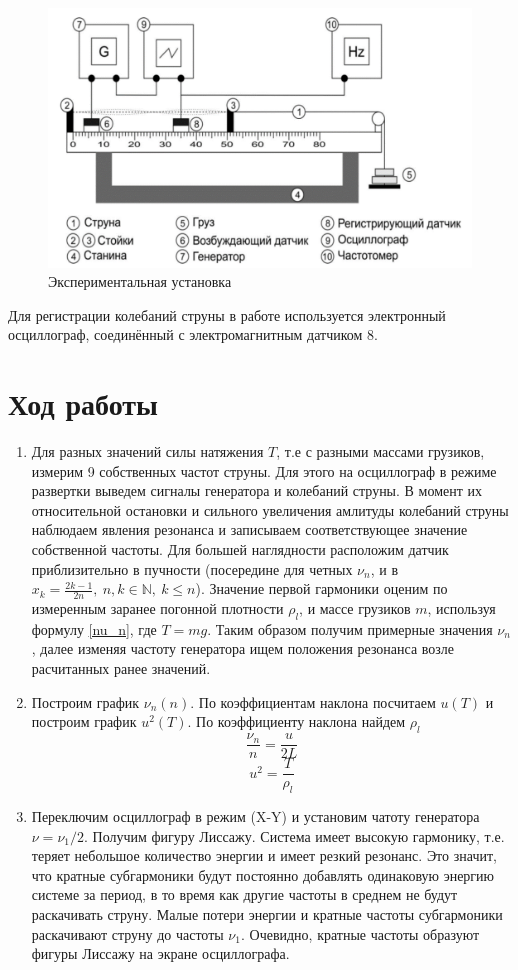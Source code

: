 \documentclass[a4paper, 12pt]{article}
\begin{document}
\begin{figure}[h!]
    \centering
    \includegraphics[scale=0.5]{exp_setup.png}
    \caption{Экспериментальная установка}
    \label{fig:experimental_setup}
\end{figure}

Для регистрации колебаний струны в работе используется электронный осциллограф, соединённый с электромагнитным датчиком 8.
\newpage
\section{Ход работы}
\begin{enumerate}
    \item Для разных значений силы натяжения \(T\), т.е с разными массами грузиков, измерим 9 собственных частот струны. Для этого на осциллограф в режиме развертки выведем сигналы генератора и колебаний струны. В момент их относительной остановки и сильного увеличения амлитуды колебаний струны наблюдаем явления резонанса и записываем соответствующее значение собственной частоты. Для большей наглядности расположим датчик приблизительно в пучности (посередине для четных \(\nu_n\), и в \(x_k = \frac{2k-1}{2n}, \ n,k \in \mathbb{N}, \ k\leq n\)). Значение первой гармоники оценим по измеренным заранее погонной плотности \(\rho_l\), и массе грузиков \(m\), используя формулу \ref{nu_n}, где \(T=mg\). Таким образом получим примерные значения \(\nu_n\), далее изменяя частоту генератора ищем положения резонанса возле расчитанных ранее значений.
    \item Построим график \(\nu_n(n)\). По коэффициентам наклона посчитаем \(u(T)\)  и построим график \(u^2(T)\). По коэффициенту наклона найдем \(\rho_l\)
    \[\frac{\nu_n}{n} = \frac{u}{2L}\]
    \[u^2 = \frac{T}{\rho_l}\]
    \item Переключим осциллограф в режим (X-Y) и установим чатоту генератора \(\nu = \nu_1/2\). Получим фигуру Лиссажу. Система имеет высокую гармонику, т.е. теряет небольшое количество энергии и имеет резкий резонанс. Это значит, что кратные субгармоники будут постоянно добавлять одинаковую энергию системе за период, в то время как другие частоты в среднем не будут раскачивать струну. Малые потери энергии и кратные частоты субгармоники раскачивают струну до частоты \(\nu_1\). Очевидно, кратные частоты образуют фигуры Лиссажу на экране осциллографа.
\end{enumerate}
\end{document}
